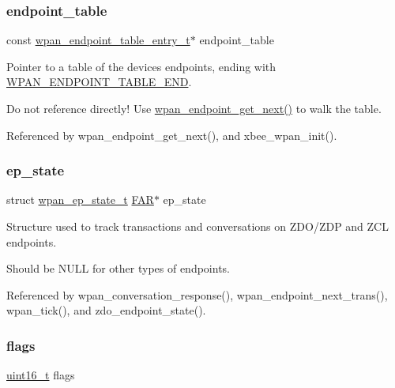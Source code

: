 \subsubsection{\texorpdfstring{endpoint\+\_\+table}{endpoint\_table}}
{\footnotesize\ttfamily const \hyperlink{structwpan__endpoint__table__entry__t}{wpan\+\_\+endpoint\+\_\+table\+\_\+entry\+\_\+t}$\ast$ endpoint\+\_\+table}



Pointer to a table of the device\textquotesingle{}s endpoints, ending with \hyperlink{group__wpan__aps_gaac571cafa96f8201c714feb0634afa92}{W\+P\+A\+N\+\_\+\+E\+N\+D\+P\+O\+I\+N\+T\+\_\+\+T\+A\+B\+L\+E\+\_\+\+E\+ND}. 

Do not reference directly! Use \hyperlink{group__wpan__aps_gaca3b72047ea4e156ce9a977c13624b5c}{wpan\+\_\+endpoint\+\_\+get\+\_\+next()} to walk the table. 

Referenced by wpan\+\_\+endpoint\+\_\+get\+\_\+next(), and xbee\+\_\+wpan\+\_\+init().

\mbox{\label{group__wpan__aps_ga389966cb276b33004b14ee698c270347}} 
\subsubsection{\texorpdfstring{ep\+\_\+state}{ep\_state}}
{\footnotesize\ttfamily struct \hyperlink{structwpan__ep__state__t}{wpan\+\_\+ep\+\_\+state\+\_\+t} \hyperlink{group__hal_gaef060b3456fdcc093a7210a762d5f2ed}{F\+AR}$\ast$ ep\+\_\+state}



Structure used to track transactions and conversations on Z\+D\+O/\+Z\+DP and Z\+CL endpoints. 

Should be N\+U\+LL for other types of endpoints. 

Referenced by wpan\+\_\+conversation\+\_\+response(), wpan\+\_\+endpoint\+\_\+next\+\_\+trans(), wpan\+\_\+tick(), and zdo\+\_\+endpoint\+\_\+state().

\mbox{\label{group__wpan__aps_ga1e87af3c18a2fd36c61faf89949bdc3f}} 
\subsubsection{\texorpdfstring{flags}{flags}}
{\footnotesize\ttfamily \hyperlink{group__hal__dos_ga5a8b2dc9e45a9ee81a94ef304fb62505}{uint16\+\_\+t} flags}



